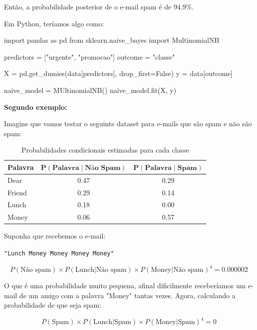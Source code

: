 \documentclass{article}
\begin{document}
Então, a probabilidade posterior de o e-mail spam é de 94.9\%.

Em Python, teríamos algo como:

\begin{pythoncode} 
import pandas as pd 
from sklearn.naive_bayes import MultinomialNB 

predictors = ["urgente", "promocao"]
outcome = "classe" 

X = pd.get_dumies(data[predictors], drop_first=False)
y = data[outcome]

naive_model = MUltinomialNB()
naive_model.fit(X, y)
\end{pythoncode}

\textbf{Segundo exemplo:}

Imagine que vamos testar o seguinte dataset para e-mails que são spam e não são spam:

\begin{table}[h]
\centering
\begin{tabular}{lcc}
\hline
\textbf{Palavra} & 
$\mathbf{P(\text{Palavra} \mid \text{Não Spam})}$ & 
$\mathbf{P(\text{Palavra} \mid \text{Spam})}$ \\
\hline
Dear   & 0.47 & 0.29 \\
Friend & 0.29 & 0.14 \\
Lunch  & 0.18 & 0.00 \\
Money  & 0.06 & 0.57 \\
\hline
\end{tabular}
\caption{Probabilidades condicionais estimadas para cada classe}
\end{table}

Suponha que recebemos o e-mail:

\begin{center}
\texttt{"Lunch Money Money Money Money"}
\end{center}

\begin{equation*}
    P(\text{Não spam}) \times P(\text{Lunch} | \text{Não spam}) \times P(\text{Money} | \text{Não spam})^4 = 0.000002 
\end{equation*}

O que é uma probabilidade muito pequena, afinal dificilmente receberíamos um e-mail de um amigo
com a palavra "Money" tantas vezes. Agora, calculando a probabilidade de que seja spam:

\begin{equation*}
    P(\text{Spam}) \times P(\text{Lunch} | \text{Spam}) \times P(\text{Money} | \text{Spam})^4 = 0
\end{equation*}
\end{document}

